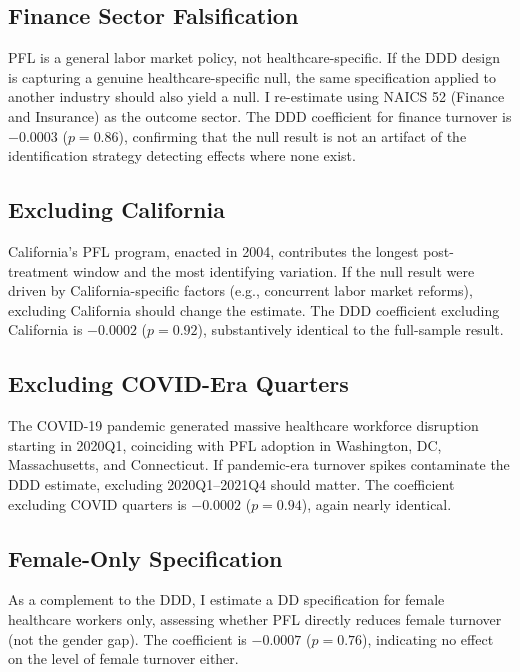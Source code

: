 \documentclass[12pt]{article}
\begin{document}
\subsection{Finance Sector Falsification}

PFL is a general labor market policy, not healthcare-specific. If the DDD design is capturing a genuine healthcare-specific null, the same specification applied to another industry should also yield a null. I re-estimate  using NAICS 52 (Finance and Insurance) as the outcome sector. The DDD coefficient for finance turnover is $-0.0003$ ($p = 0.86$), confirming that the null result is not an artifact of the identification strategy detecting effects where none exist.

\subsection{Excluding California}

California's PFL program, enacted in 2004, contributes the longest post-treatment window and the most identifying variation. If the null result were driven by California-specific factors (e.g., concurrent labor market reforms), excluding California should change the estimate. The DDD coefficient excluding California is $-0.0002$ ($p = 0.92$), substantively identical to the full-sample result.

\subsection{Excluding COVID-Era Quarters}

The COVID-19 pandemic generated massive healthcare workforce disruption starting in 2020Q1, coinciding with PFL adoption in Washington, DC, Massachusetts, and Connecticut. If pandemic-era turnover spikes contaminate the DDD estimate, excluding 2020Q1--2021Q4 should matter. The coefficient excluding COVID quarters is $-0.0002$ ($p = 0.94$), again nearly identical.

\subsection{Female-Only Specification}

As a complement to the DDD, I estimate a DD specification for female healthcare workers only, assessing whether PFL directly reduces female turnover (not the gender gap). The coefficient is $-0.0007$ ($p = 0.76$), indicating no effect on the level of female turnover either.
\end{document}
